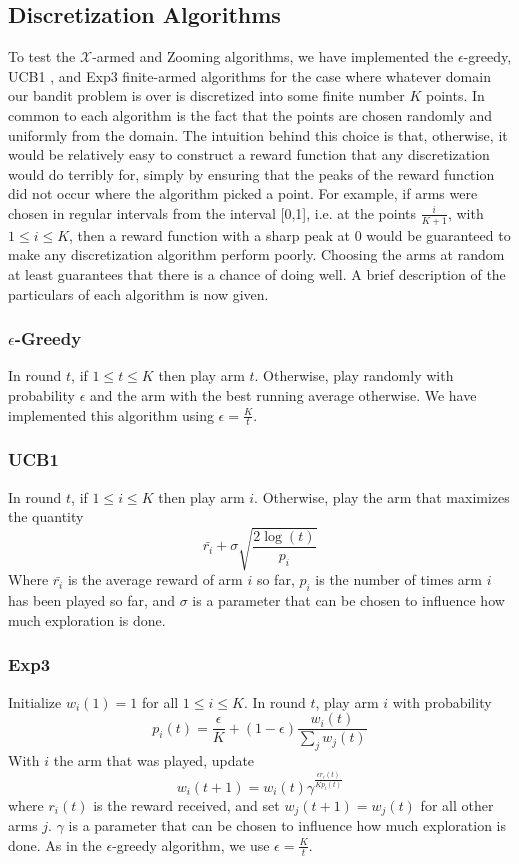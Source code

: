 \subsection{Discretization Algorithms}
To test the $\mathcal{X}$-armed and Zooming algorithms, we have
implemented the $\epsilon$-greedy, UCB1 \cite{auer2002finite}, and
Exp3 \cite{auer1995gambling} finite-armed algorithms for the case
where whatever domain our bandit problem is over is discretized into
some finite number $K$ points.  In common to each algorithm is the
fact that the points are chosen randomly and uniformly from the
domain.  The intuition behind this choice is that, otherwise, it would
be relatively easy to construct a reward function that any
discretization would do terribly for, simply by ensuring that the
peaks of the reward function did not occur where the algorithm picked
a point.  For example, if arms were chosen in regular intervals from
the interval [0,1], i.e. at the points $\frac{i}{K+1}$, with $1 \leq i
\leq K$, then a reward function with a sharp peak at 0 would be
guaranteed to make any discretization algorithm perform poorly.
Choosing the arms at random at least guarantees that there is a chance
of doing well.  A brief description of the particulars of each
algorithm is now given.

\subsubsection{$\epsilon$-Greedy}
In round $t$, if $1 \leq t \leq K$ then play arm $t$.  Otherwise, play
randomly with probability $\epsilon$ and the arm with the best running
average otherwise.  We have implemented this algorithm using $\epsilon
= \frac{K}{t}$.

\subsubsection{UCB1}
In round $t$, if $1 \leq i \leq K$ then play arm $i$.  Otherwise, play
the arm that maximizes the quantity
\[
	\bar{r_i} + \sigma \sqrt{\frac{2 \log(t)}{p_i}}
\]
Where $\bar{r_i}$ is the average reward of arm $i$ so far, $p_i$ is
the number of times arm $i$ has been played so far, and $\sigma$ is a
parameter that can be chosen to influence how much exploration is
done.

\subsubsection{Exp3}
Initialize $w_i(1) = 1$ for all $1 \leq i \leq K$.  In round $t$, play
arm $i$ with probability
\[
	p_i(t) = \frac{\epsilon}{K} + (1 - \epsilon) \frac{w_i(t)}{\sum_j w_j(t)}
\]
With $i$ the arm that was played, update
\[
	w_i(t+1) = w_i(t)\gamma^{\frac{\epsilon r_i(t)}{K p_i(t)}}
\]
where $r_i(t)$ is the reward received, and set $w_j(t+1) = w_j(t)$ for
all other arms $j$.  $\gamma$ is a parameter that can be chosen to
influence how much exploration is done.  As in the $\epsilon$-greedy
algorithm, we use $\epsilon = \frac{K}{t}$.
